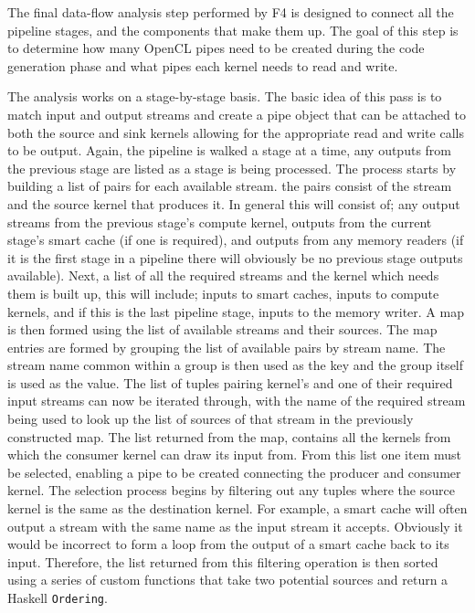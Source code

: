 \documentclass{mpaper}
\begin{document}
The final data-flow analysis step performed by F4 is designed to connect all the pipeline stages, and the components that make them up.
The goal of this step is to determine how many OpenCL pipes need to be created during the code generation phase and what pipes each kernel needs to read and write. 

The analysis works on a stage-by-stage basis. 
The basic idea of this pass is to match input and output streams and create a pipe object that can be attached to both the source and sink kernels allowing for the appropriate read and write calls to be output.  
Again, the pipeline is walked a stage at a time, any outputs from the previous stage are listed as a stage is being processed.
The process starts by building a list of pairs for each available stream.
the pairs consist of the stream and the source kernel that produces it.
In general this will consist of; any output streams from the previous stage's compute kernel, outputs from the current stage's smart cache (if one is required), and outputs from any memory readers (if it is the first stage in a pipeline there will obviously be no previous stage outputs available).
Next, a list of all the required streams and the kernel which needs them is built up, this will include; inputs to smart caches, inputs to compute kernels, and if this is the last pipeline stage, inputs to the memory writer. 
A map is then formed using the list of available streams and their sources.
The map entries are formed by grouping the list of available pairs by stream name.
The stream name common within a group is then used as the key and the group itself is used as the value.
The list of tuples pairing kernel's and one of their required input streams can now be iterated through, with the name of the required stream being used to look up the list of sources of that stream in the previously constructed map. 
The list returned from the map, contains all the kernels from which the consumer kernel can draw its input from.
From this list one item must be selected, enabling a pipe to be created connecting the producer and consumer kernel.
The selection process begins by filtering out any tuples where the source kernel is the same as the destination kernel.
For example, a smart cache will often output a stream with the same name as the input stream it accepts.
Obviously it would be incorrect to form a loop from the output of a smart cache back to its input.
Therefore, the list returned from this filtering operation is then sorted using a series of custom functions that take two potential sources and return a Haskell \texttt{Ordering}.
\end{document}

